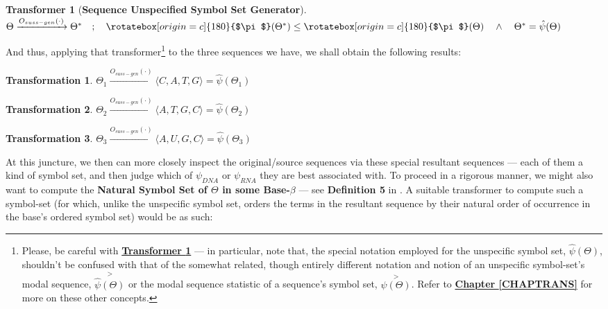 \documentclass[a4paper, 18pt]{book} %
\newtheorem{trans}{Transformation}
\newtheorem{transf}{Transformer}
\newcommand{\invpi}{\rotatebox[origin=c]{180}{$\pi$}}
\begin{document}
\vspace{1em}

\begin{transf}[\textbf{Sequence Unspecified Symbol Set Generator}]
\label{TRANSSSGEN}$ $\\
$\Theta \xrightarrow{O_{suss-gen}(\cdot)} \Theta^* \quad;\quad \invpi(\Theta^*) \leq \invpi(\Theta) \quad \land \quad \Theta^* = \hat{\psi}(\Theta)$
\end{transf}

\vspace{1em}

And thus, applying that transformer\footnote{Please, be careful with \textbf{\hyperref[TRANSSSGEN]{Transformer \ref{TRANSSSGEN}}} --- in particular, note that, the special notation employed for the unspecific symbol set, $\hat{\psi}(\Theta)$, shouldn't be confused with that of the somewhat related, though entirely different notation and notion of an unspecific symbol-set's modal sequence, $\overset{>}{\hat{\psi}(\Theta)}$ or the modal sequence statistic of a sequence's symbol set,  $\overset{>}{\psi(\Theta)}$. Refer to \textbf{\hyperref[CHAPTRANS]{Chapter \ref{CHAPTRANS}}} for more on these other concepts.} to the three sequences we have, we shall obtain the following results:

\vspace{1em}

\begin{trans}
$\Theta_1 \xrightarrow{O_{suss-gen}(\cdot)} \langle C, A, T, G \rangle = \hat{\psi}(\Theta_1)$
\end{trans}

\begin{trans}
$\Theta_2 \xrightarrow{O_{suss-gen}(\cdot)} \langle A, T, G, C \rangle = \hat{\psi}(\Theta_2)$
\end{trans}

\begin{trans}
$\Theta_3 \xrightarrow{O_{suss-gen}(\cdot)} \langle A, U, G, C \rangle = \hat{\psi}(\Theta_3)$
\end{trans}

\vspace{1em}

At this juncture, we then can more closely inspect the original/source sequences via these special resultant sequences --- each of them a kind of symbol set, and then judge which of $\psi_{DNA}$ or $\psi_{RNA}$ they are best associated with. To proceed in a rigorous manner, we might also want to compute the \textbf{Natural Symbol Set of $\Theta$ in some Base-$\beta$} --- see \textbf{Definition 5} in \cite{ossipaper}. A suitable transformer to compute such a symbol-set (for which, unlike the unspecific symbol set, orders the terms in the resultant sequence by their natural order of occurrence in the base's ordered symbol set) would be as such:
\end{document}
